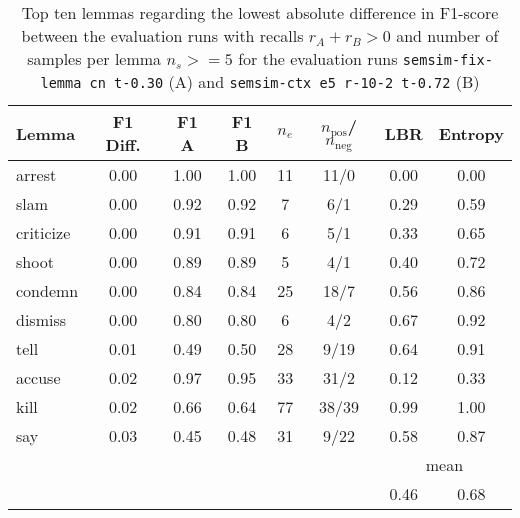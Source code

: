 \documentclass[11pt]{scrreprt}
\begin{document}
{\begin{table}[htp]
\centering
\begin{tabular}{lccccccc}
\toprule
Lemma      & F1 Diff. & F1 A & F1 B & \(n_e\) & \(n_\text{pos}\)/\(n_\text{neg}\) & LBR & Entropy \\
\midrule
arrest     & 0.00      & 1.00           & 1.00           & 11              & 11/0    & 0.00 & 0.00 \\
slam       & 0.00      & 0.92           & 0.92           & 7               & 6/1     & 0.29 & 0.59 \\
criticize  & 0.00      & 0.91           & 0.91           & 6               & 5/1     & 0.33 & 0.65 \\
shoot      & 0.00      & 0.89           & 0.89           & 5               & 4/1     & 0.40 & 0.72 \\
condemn    & 0.00      & 0.84           & 0.84           & 25              & 18/7    & 0.56 & 0.86 \\
dismiss    & 0.00      & 0.80           & 0.80           & 6               & 4/2     & 0.67 & 0.92 \\
tell       & 0.01      & 0.49           & 0.50           & 28              & 9/19    & 0.64 & 0.91 \\
accuse     & 0.02      & 0.97           & 0.95           & 33              & 31/2    & 0.12 & 0.33 \\
kill       & 0.02      & 0.66           & 0.64           & 77              & 38/39   & 0.99 & 1.00 \\
say        & 0.03      & 0.45           & 0.48           & 31              & 9/22    & 0.58 & 0.87 \\
\cmidrule{7-8}
\multicolumn{6}{l}{} & \multicolumn{2}{c}{mean} \\
\multicolumn{6}{l}{} & 0.46 & 0.68 \\
\bottomrule
\end{tabular}
\caption{Top ten lemmas regarding the lowest absolute difference in F1-score between the evaluation runs with recalls \(r_A + r_B > 0\) and number of samples per lemma \(n_s >= 5\) for the evaluation runs \texttt{semsim-fix-lemma cn t-0.30} (A) and \texttt{semsim-ctx e5 r-10-2 t-0.72} (B)}
\label{tab:predicate-lemma-lowest-f1}
\end{table}

}
\end{document}
